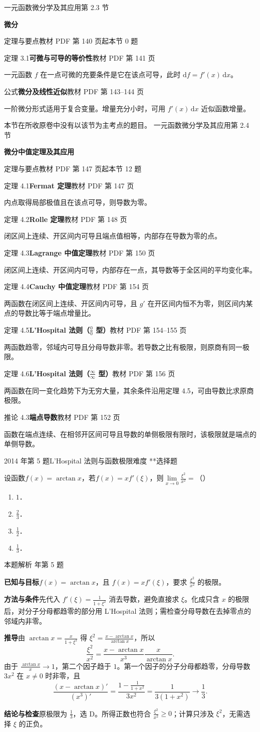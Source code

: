 \documentclass[UTF8,zihao=-4,fontset=fandol]{ctexart}
\renewcommand{\lim}{\operatorname*{lim}\limits}
\newcommand{\SectionHeading}[4]{%
  \clearpage\hypertarget{sec-#1}{}%
  {\small\textcolor{accent}{#2\hfill 第 #1 节}}\par\medskip
  {\LARGE\bfseries #3}\par\smallskip
  {\small\textcolor{muted}{#4}}\par\bigskip}
\newcommand{\Theory}[4]{%
  {\small\textcolor{accent}{#1}\quad\textbf{#3}\hfill\textcolor{muted}{教材 PDF 第 #2 页}}\par
  {\small #4}\par\smallskip}
\newcommand{\pickout}{\hfill（\hspace{1.4em}）}
\newenvironment{abcd}{\begin{enumerate}[label=\textup{(\Alph*)},leftmargin=2.3em,itemsep=1pt,topsep=4pt,parsep=1pt]}{\end{enumerate}}
\newcounter{BankQuestion}
\newcommand{\QuestionPage}[7]{%
  \stepcounter{BankQuestion}%
  \par\noindent\begin{minipage}{\linewidth}
  \raggedright
  {\small\textcolor{black!60}{#3\quad #5\quad 难度 #7}\hfill\textcolor{accent}{#2}}\par\smallskip}
\newcommand{\QuestionEnd}{\end{minipage}\par\medskip}
\newcommand{\QuestionPage}[7]{%
  \clearpage
  \stepcounter{BankQuestion}%
  {\small\textcolor{accent}{#1\hfill #2}}\par\medskip
  {\small\textcolor{black!60}{#3\quad #5\quad 难度 #7\hfill \arabic{BankQuestion} / 234}}\par\vspace{9bp}}
\newcommand{\QuestionEnd}{}
\newenvironment{QuestionSolution}[1]{%
  \clearpage
  {\small\textcolor{black!60}{本题解析\quad #1}}\par\medskip
}{\par\clearpage}
\begin{document}
\SectionHeading{2.3}{一元函数微分学及其应用}{微分}{定理与要点\quad 教材 PDF 第 140 页起\hfill 本节 0 题}
\Theory{定理 3.1}{141}{可微与可导的等价性}{一元函数 \(f\) 在一点可微的充要条件是它在该点可导，此时 \(\mathrm{d}f=f'(x)\,\mathrm{d}x\)。}
\Theory{公式}{143--144}{微分及线性近似}{一阶微分形式适用于复合变量。增量充分小时，可用 \(f'(x)\,\mathrm{d}x\) 近似函数增量。}
本节在所收原卷中没有以该节为主考点的题目。
\SectionHeading{2.4}{一元函数微分学及其应用}{微分中值定理及其应用}{定理与要点\quad 教材 PDF 第 147 页起\hfill 本节 12 题}
\Theory{定理 4.1}{147}{Fermat 定理}{内点取得局部极值且在该点可导，则导数为零。}
\Theory{定理 4.2}{148}{Rolle 定理}{闭区间上连续、开区间内可导且端点值相等，内部存在导数为零的点。}
\Theory{定理 4.3}{150}{Lagrange 中值定理}{闭区间上连续、开区间内可导，内部存在一点，其导数等于全区间的平均变化率。}
\Theory{定理 4.4}{154}{Cauchy 中值定理}{两函数在闭区间上连续、开区间内可导，且 \(g'\) 在开区间内恒不为零，则区间内某点的导数比等于端点增量比。}
\Theory{定理 4.5}{154--155}{L'Hospital 法则（\(\frac{0}{0}\) 型）}{两函数趋零，邻域内可导且分母导数非零。若导数之比有极限，则原商有同一极限。}
\Theory{定理 4.6}{156}{L'Hospital 法则（\(\frac{\infty}{\infty}\) 型）}{两函数在同一变化趋势下为无穷大量，其余条件沿用定理 4.5，可由导数比求原商极限。}
\Theory{推论 4.3}{152}{端点导数}{函数在端点连续、在相邻开区间可导且导数的单侧极限有限时，该极限就是端点的单侧导数。}
\QuestionPage{2.4 微分中值定理及其应用}{选择题}{2014 年第 5 题}{1}{L'Hospital 法则与函数极限}{084 / 234}{**}
设函数$f(x) = \arctan x$，若$f(x) = xf'(\xi)$，则$\lim_{x \to 0} \frac{\xi^2}{x^2} =$\pickout{}
\begin{abcd}
\item $1$．
\item $\frac{2}{3}$．
\item $\frac{1}{2}$．
\item $\frac{1}{3}$．
\end{abcd}
\QuestionEnd

\begin{QuestionSolution}{2014 年第 5 题}
\textbf{已知与目标}\quad \(f(x)=\arctan x\)，且 \(f(x)=xf'(\xi)\)，要求 \(\frac{\xi^2}{x^2}\) 的极限。

\textbf{方法与条件}\quad 先代入 \(f'(\xi)=\frac1{1+\xi^2}\) 消去导数，避免直接求 \(\xi\)。化成只含 \(x\) 的极限后，对分子分母都趋零的部分用 L'Hospital 法则；需检查分母导数在去掉零点的邻域内非零。

\textbf{推导}\quad 由 \(\arctan x=\frac{x}{1+\xi^2}\) 得 \(\xi^2=\frac{x-\arctan x}{\arctan x}\)，所以
\[
\frac{\xi^2}{x^2}
=\frac{x-\arctan x}{x^3}\frac{x}{\arctan x}.
\]
由于 \(\frac{\arctan x}{x}\to1\)，第二个因子趋于 \(1\)。第一个因子的分子分母都趋零，分母导数 \(3x^2\) 在 \(x\ne0\) 时非零，且
\[\frac{(x-\arctan x)'}{(x^3)'}=\frac{1-\frac1{1+x^2}}{3x^2}=\frac1{3(1+x^2)}\to\frac13.\]

\textbf{结论与检查}\quad 原极限为 \(\boxed{\frac{1}{3}}\)，选 D。所得正数也符合 \(\frac{\xi^2}{x^2}\ge0\)；计算只涉及 \(\xi^2\)，无需选择 \(\xi\) 的正负。
\end{QuestionSolution}
\end{document}
